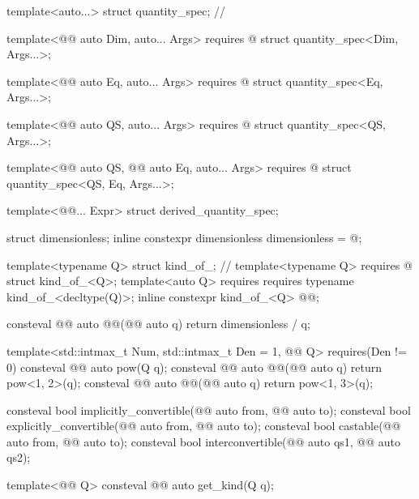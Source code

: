\begin{codeblock}
{template<auto...>
struct quantity_spec;  // \notdef

template<@@ auto Dim, auto... Args>
  requires @\seebelownc@
struct quantity_spec<Dim, Args...>;

template<@@ auto Eq, auto... Args>
  requires @\seebelownc@
struct quantity_spec<Eq, Args...>;

template<@@ auto QS, auto... Args>
  requires @\seebelownc@
struct quantity_spec<QS, Args...>;

template<@@ auto QS, @@ auto Eq, auto... Args>
  requires @\seebelownc@
struct quantity_spec<QS, Eq, Args...>;

template<@@... Expr>
struct derived_quantity_spec;

struct dimensionless;
inline constexpr dimensionless dimensionless = @\seebelownc@;

template<typename Q>
struct kind_of_;  // \notdef
template<typename Q>
  requires @\seebelownc@
struct kind_of_<Q>;
template<auto Q>
  requires requires { typename kind_of_<decltype(Q)>; }
inline constexpr kind_of_<Q> @@{};

consteval @@ auto @@(@@ auto q) { return dimensionless / q; }

template<std::intmax_t Num, std::intmax_t Den = 1, @@ Q>
  requires(Den != 0)
consteval @@ auto pow(Q q);
consteval @@ auto @@(@@ auto q) { return pow<1, 2>(q); }
consteval @@ auto @@(@@ auto q) { return pow<1, 3>(q); }

consteval bool implicitly_convertible(@@ auto from, @@ auto to);
consteval bool explicitly_convertible(@@ auto from, @@ auto to);
consteval bool castable(@@ auto from, @@ auto to);
consteval bool interconvertible(@@ auto qs1, @@ auto qs2);

template<@@ Q>
consteval @@ auto get_kind(Q q);

}
\end{codeblock}
